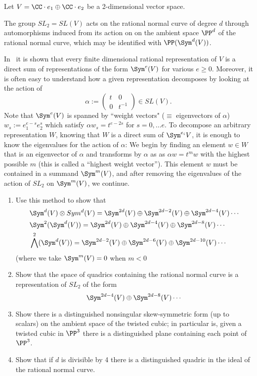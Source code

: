 \begin{exercise}\label{rnc and representations}
Let $V = \CC\cdot e_1\oplus \CC\cdot e_2$ be a 2-dimensional vector space. 

The group $SL_2= SL(V)$ acts on the rational normal curve of degree $d$ through automorphisms induced from its action on
 on the ambient space $\PP^d$ of the rational normal curve, which may be identified with $\PP(\Sym^d(V))$.

In~\cite[pp. 146--150]{Fulton-Harris} it is shown that
 every finite dimensional rational 
representation of $V$ is a direct sum of representations of the form $\Sym^e(V)$ for various $e\geq 0$. Moreover, it is often easy to understand
how a given representation decomposes by looking at the action of
$$
\alpha := \begin{pmatrix}
t&0\\
0&t^{-1}
\end{pmatrix}
\in SL(V).
$$
Note that $\Sym^e(V)$ is spanned by ``weight vectors" ($\equiv$ eigenvectors of $\alpha$) $w_s := e_1^{e-s} e_2^{s}$ 
which satisfy $\alpha w_s = t^{e-2s}$ for $s = 0, \dots e$.
To decompose an arbitrary representation $W$, knowing that $W$ is a direct sum of $\Sym^{e_i}V$, it is enough to know the 
eigenvalues for the action of $\alpha$: We begin by finding an element $w\in W$ that
is an eigenvector of $\alpha$ and transforms by $\alpha$ as
as $\alpha w = t^mw$ with the highest possible $m$ (this is called a ``highest weight vector''). This element $w$ must be contained
in a summand $\Sym^m(V)$, and after removing the eigenvalues of the action of $SL_2$ on $\Sym^m(V)$, we continue. 
\begin{enumerate}
 \item Use this method to show that 
\begin{align*}
&\Sym^d(V)\otimes Sym^d(V)= \Sym^{2d}(V) \oplus  \Sym^{2d-2}(V) \oplus \Sym^{2d-4}(V) \cdots\\
 &\Sym^2(\Sym^d(V))= \Sym^{2d}(V) \oplus \Sym^{2d-4}(V)\oplus \Sym^{2d-8}(V) \cdots\\
 &\bigwedge^2(\Sym^d(V))= \Sym^{2d-2}(V) \oplus \Sym^{2d-6}(V)\oplus \Sym^{2d-10}(V) \cdots
\end{align*}
  (where we take $\Sym^{m}(V)=0$ when $m<0$
 \item Show that the space of quadrics containing the rational normal curve is a representation of $SL_2$ of the form
 $$
 \Sym^{2d-4}(V)\oplus \Sym^{2d-8}(V) \cdots
 $$
  \item Show  there is a distinguished nonsingular skew-symmetric form (up to scalars) on the ambient space of the twisted cubic; in particular
  is, given a twisted cubic in $\PP^3$ there is a distinguished plane containing each point of $\PP^3$.
 \item Show that if $d$ is divisible by 4 there is a distinguished quadric in the ideal of the rational normal curve.
\end{enumerate}
\end{exercise}

